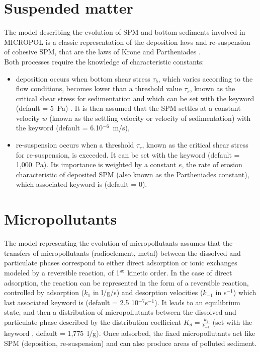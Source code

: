 \section{Suspended matter}

The model describing the evolution of SPM and bottom sediments involved in MICROPOL
is a classic representation of the deposition laws and re-suspension
of cohesive SPM, that are the laws of Krone \cite{krone_flume_1962}
and Partheniades \cite{partheniades_erosion_deposition_1965}.\\

Both processes require the knowledge of characteristic constants:

\begin{itemize}
\item deposition occurs when bottom shear stress $\tau_b$,
  which varies according to the flow conditions, becomes lower than a threshold value $\tau_s$,
  known as the critical shear stress for sedimentation
  and which can be set with the keyword 
  (default = 5~Pa) .
  It is then assumed that the SPM settles at a constant velocity $w$
  (known as the settling velocity or velocity of sedimentation)
  with the keyword 
  (default = 6.10$^{-6}$~m/s),
\item re-suspension occurs when a threshold $\tau_r$,
  known as the critical shear stress for re-suspension, is exceeded.
  It can be set with the keyword 
  (default = 1,000~Pa).
  Its importance is weighted by a constant $e$, the rate of erosion characteristic
  of deposited SPM (also known as the Partheniades constant),
  which associated keyword is  (default = 0).
\end{itemize}

\section{Micropollutants}

The model representing the evolution of micropollutants assumes
that the transfers of micropollutants (radioelement, metal)
between the dissolved and particulate phases correspond to either
direct adsorption or ionic exchanges modeled by a reversible reaction,
of 1$^{\rm{st}}$ kinetic order.
In the case of direct adsorption, the reaction can be represented in the form of
a reversible reaction, controlled by adsorption ($k_1$ in l/g/s)
and desorption velocities ($k_{-1}$ in s$^{-1}$)
which last associated keyword is 
(default = 2.5 10$^{-7}$s$^{-1}$).
It leads to an equilibrium state, and then a distribution of micropollutants
between the dissolved and particulate phase described
by the distribution coefficient $K_d = \frac{k_1}{k_{-1}}$
(set with the keyword
, default = 1,775~l/g).
Once adsorbed, the fixed micropollutants act like SPM (deposition, re-suspension)
and can also produce areas of polluted sediment.\\

